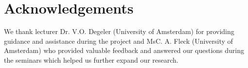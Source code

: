 \section {Acknowledgements}
We thank lecturer Dr. V.O. Degeler (University of Amsterdam) for providing guidance and assistance during the project and MsC. A. Fleck (University of Amsterdam) who provided valuable feedback and answered our questions during the seminars which helped us further expand our research. 